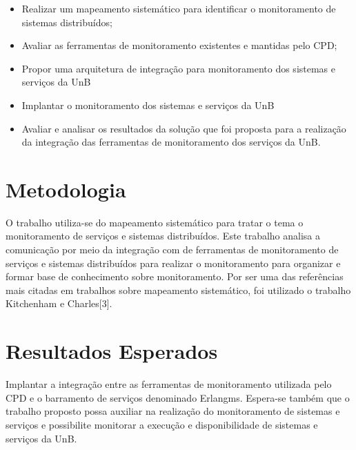 \begin{itemize}
	 
\item Realizar um mapeamento sistemático para identificar o monitoramento
de sistemas distribuídos;

\item Avaliar as ferramentas de monitoramento existentes e mantidas pelo \acrshort{CPD};

\item Propor uma arquitetura de integração para monitoramento dos sistemas e serviços da \acrshort{UnB}

\item Implantar o monitoramento dos sistemas e serviços da \acrshort{UnB}

\item Avaliar e analisar os resultados da solução que foi proposta para a realização da integração das ferramentas de monitoramento dos serviços da \acrshort{UnB}. 

\end{itemize}

\section{Metodologia}

O trabalho utiliza-se do mapeamento sistemático para tratar o tema o monitoramento de serviços e sistemas distribuídos. Este trabalho analisa a comunicação por meio da integração com de ferramentas de monitoramento de serviços e sistemas distribuídos para realizar o monitoramento para organizar e formar base de conhecimento sobre monitoramento. Por ser uma das referências mais citadas em trabalhos sobre mapeamento sistemático, foi utilizado o trabalho Kitchenham e Charles[3].


\section{Resultados Esperados}

Implantar a integração entre as ferramentas de monitoramento utilizada pelo \acrshort{CPD} e o barramento de serviços denominado Erlangms\cite{Agilar}. Espera-se também que o trabalho proposto possa auxiliar na realização do monitoramento de sistemas e serviços e possibilite monitorar a execução e disponibilidade de sistemas e serviços da \acrshort{UnB}.

